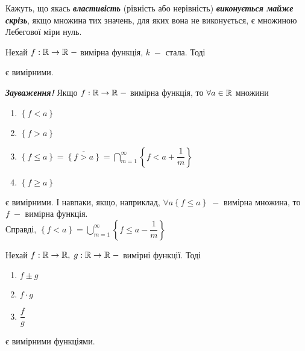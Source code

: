\begin{definition}
        Кажуть, що якась \textcolor{NavyBlue}{\textbf{\textit{властивість}}} (рівність або нерівність) \textcolor{NavyBlue}{\textbf{\textit{виконується майже скрізь}}}, якщо множина тих значень, для яких вона не виконується, є множиною Лебегової міри нуль.
\end{definition}
\begin{theorem}
  Нехай $f: \RR \rightarrow \RR \;-$ вимірна функція, $k\;-$ стала. Тоді
  \begin{enumerate}
      \item $f + k$
      \item $fk$
      \item $|f|}$
      \item $f^2$
      \item $\dfrac{1}{f}$
  \end{enumerate}
  є вимірними.
 \newpage
\end{theorem}
\textcolor{NavyBlue}{\textbf{\textit{Зауваження!}}} Якщо $f: \RR \rightarrow \RR \;-$ вимірна функція, то $\forall a \in \RR$ множини
  \begin{enumerate}
      \item $\left\{ f<a \right\}$
      \item $\left\{ f>a \right\}$
      \item $\left\{ f \leqslant a \right\} = \overline{\left\{ f>a \right\}}= \displaystyle\bigcap\limits_{m = 1}^{\infty} \left\{ f<a+\dfrac{1}{m} \right\} $
      \item $\left\{ f \geqslant a \right\}$
  \end{enumerate}
є вимірними. І навпаки, якщо, наприклад, $\forall a \left\{ f \leqslant a \right\} \;-$ вимірна множина, то $f \;-$ вимірна функція. \\
Справді, $\left\{ f<a \right\} =\displaystyle\bigcup\limits_{m = 1}^{\infty} \left\{ f \leqslant a-\dfrac{1}{m} \right\} $

\begin{theorem}
   Нехай $f: \mathbb{R} \rightarrow \mathbb{R},\; g: \mathbb{R} \rightarrow \mathbb{R} \;-$ вимірні функції. Тоді
   \begin{enumerate}
       \item $f \pm g$
       \item $f \cdot g$
       \item $\dfrac{f}{g}$
   \end{enumerate}
  є вимірними функціями.
\end{theorem}